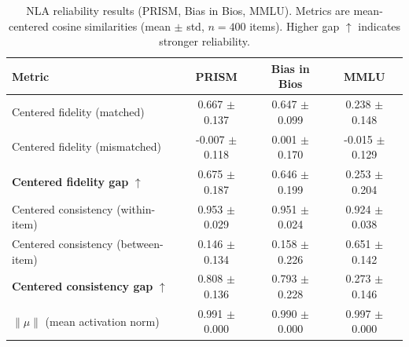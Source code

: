\begin{table}[ht]
\centering
\caption{NLA reliability results (PRISM, Bias in Bios, MMLU). Metrics are mean-centered cosine similarities (mean $\pm$ std, $n{=}400$ items). Higher gap $\uparrow$ indicates stronger reliability.}
\label{tab:nla_reliability}
\begin{tabular}{lccc}
\toprule
Metric & PRISM & Bias in Bios & MMLU \\
\midrule
Centered fidelity (matched) & 0.667 $\pm$ 0.137 & 0.647 $\pm$ 0.099 & 0.238 $\pm$ 0.148 \\
Centered fidelity (mismatched) & -0.007 $\pm$ 0.118 & 0.001 $\pm$ 0.170 & -0.015 $\pm$ 0.129 \\
\textbf{Centered fidelity gap} $\uparrow$ & 0.675 $\pm$ 0.187 & 0.646 $\pm$ 0.199 & 0.253 $\pm$ 0.204 \\
\midrule
Centered consistency (within-item) & 0.953 $\pm$ 0.029 & 0.951 $\pm$ 0.024 & 0.924 $\pm$ 0.038 \\
Centered consistency (between-item) & 0.146 $\pm$ 0.134 & 0.158 $\pm$ 0.226 & 0.651 $\pm$ 0.142 \\
\textbf{Centered consistency gap} $\uparrow$ & 0.808 $\pm$ 0.136 & 0.793 $\pm$ 0.228 & 0.273 $\pm$ 0.146 \\
\midrule
$\|\mu\|$ (mean activation norm) & 0.991 $\pm$ 0.000 & 0.990 $\pm$ 0.000 & 0.997 $\pm$ 0.000 \\
\bottomrule
\end{tabular}
\end{table}
